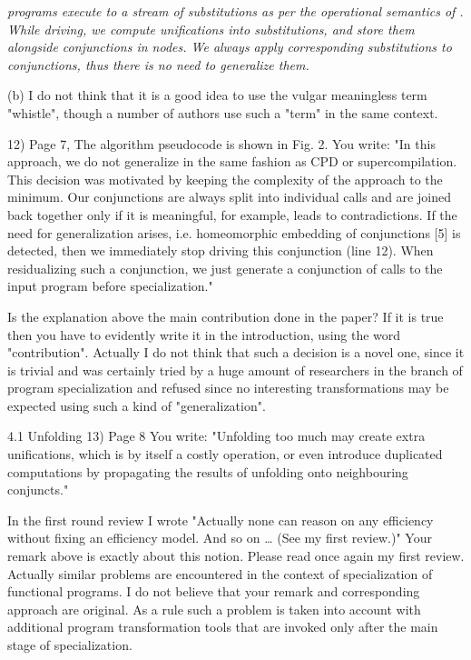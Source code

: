\emph{\mk programs execute to a stream of substitutions as per the operational semantics of \mk. While driving, we compute unifications into substitutions, and store them alongside conjunctions in nodes. We always apply corresponding substitutions to conjunctions, thus there is no need to generalize them. }

(b) I do not think that it is a good idea to use the vulgar meaningless term "whistle", though a number of authors use such a "term" in the same context.

12) Page 7, The algorithm pseudocode is shown in Fig. 2.
You write: "In this approach, we do not generalize in the same fashion as CPD or supercompilation. This decision was motivated by keeping the complexity of the approach to the minimum. Our conjunctions are always split into individual calls and are joined back together only if it is meaningful, for example, leads to contradictions. If the need for generalization arises, i.e. homeomorphic embedding of conjunctions [5] is detected, then we immediately stop driving this conjunction (line 12). When residualizing such a conjunction, we just generate a conjunction of calls to the input program before specialization."

Is the explanation above the main contribution done in the paper? If it is true then you have to evidently write it in the introduction, using the word "contribution".
Actually I do not think that such a decision is a novel one, since it is trivial and was certainly tried by a huge amount of researchers in the branch of program specialization and refused since no interesting transformations may be expected using such a kind of  "generalization".

4.1 Unfolding
13) Page 8
You write: "Unfolding too much may create extra unifications, which is by itself a costly operation, or even introduce duplicated computations by propagating the results of unfolding onto neighbouring conjuncts."

In the first round review I wrote "Actually none can reason on any efficiency without fixing an efficiency model. And so on … (See my first review.)"
Your remark above is exactly about this notion. Please read once again my first review. Actually similar problems are encountered in the context of specialization of functional programs.
I do not believe that your remark and corresponding approach are original. As a rule such a problem is taken into account with additional program transformation tools that are invoked only after the main stage of specialization.


